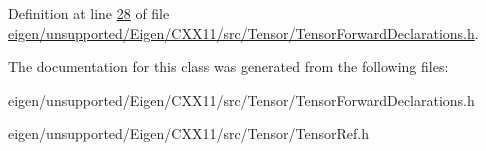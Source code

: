 Definition at line \hyperlink{eigen_2unsupported_2_eigen_2_c_x_x11_2src_2_tensor_2_tensor_forward_declarations_8h_source_l00028}{28} of file \hyperlink{eigen_2unsupported_2_eigen_2_c_x_x11_2src_2_tensor_2_tensor_forward_declarations_8h_source}{eigen/unsupported/\+Eigen/\+C\+X\+X11/src/\+Tensor/\+Tensor\+Forward\+Declarations.\+h}.



The documentation for this class was generated from the following files\+:\begin{DoxyCompactItemize}
\item 
eigen/unsupported/\+Eigen/\+C\+X\+X11/src/\+Tensor/\+Tensor\+Forward\+Declarations.\+h\item 
eigen/unsupported/\+Eigen/\+C\+X\+X11/src/\+Tensor/\+Tensor\+Ref.\+h\end{DoxyCompactItemize}
